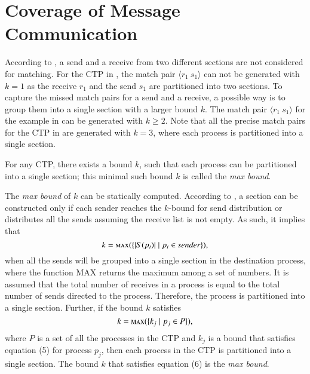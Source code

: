 \section{Coverage of Message Communication}

According to , a send and a receive from two different sections are not considered for matching. For the CTP in , the match pair $\langle r_1\ s_1\rangle$ can not be generated with $k=1$ as the receive $r_1$ and the send $s_1$ are partitioned into two sections. 
To capture the missed match pairs for a send and a receive, a possible way is to group them into a single section with a larger bound $k$.  The match pair $\langle r_1\ s_1\rangle$ for the example in  can be generated with $k\geq2$.  
Note that all the precise match pairs for the CTP in  are generated with $k=3$, where each process is partitioned into a single section.
 
\begin{definition}
\label{def:maxbound}
For any CTP, there exists a bound $k$, such that each process can be partitioned into a single section; this minimal such bound $k$ is called the \textit{max bound}. 
\end{definition} 

The \textit{max bound} of $k$ can be statically computed. 
According to , a section can be constructed only if each sender reaches the $k$-bound for send distribution or distributes all the sends assuming the receive list is not empty. As such, it implies that 
\begin{equation}
k= \Call{max}{\{|S(p_i)|\mid p_i \in \mathit{sender}\}},
\end{equation}
when all the sends will be grouped into a single section in the destination process, where the function $\mathrm{MAX}$ returns the maximum among a set of numbers. It is assumed that the total number of receives in a process is equal to the total number of sends directed to the process. Therefore, the process is partitioned into a single section. Further, if the bound $k$ satisfies   
\begin{equation}
k= \Call{max}{\{k_j \mid p_j\in P\}},
\end{equation} 
where $P$ is a set of all the processes in the CTP and $k_j$ is a bound that satisfies equation (5) for process $p_j$, then each process in the CTP is partitioned into a single section. The bound $k$ that satisfies equation (6) is the \textit{max bound}. 

